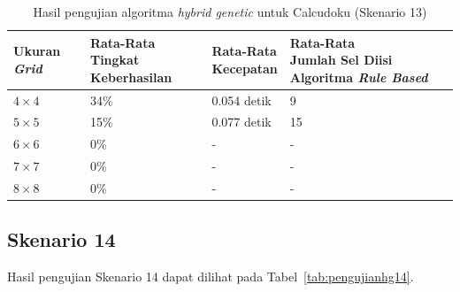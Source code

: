 \begin{table}
\centering
\captionsetup{justification=centering}
\caption[Hasil pengujian algoritma \textit{hybrid genetic} untuk Calcudoku (Skenario 13)]{Hasil pengujian algoritma \textit{hybrid genetic} untuk Calcudoku (Skenario 13)}
\begin{tabular}{| l | l | l | l |}
\hline
Ukuran \textit{Grid} & \makecell[l]{Rata-Rata \\ Tingkat Keberhasilan} & \makecell[l]{Rata-Rata \\ Kecepatan} & \makecell[l]{Rata-Rata \\ Jumlah Sel Diisi Algoritma \textit{Rule Based}} \\
\hline \hline
\begin{math}4 \times 4\end{math} & 34\% & 0.054 detik & 9 \\
\hline
\begin{math}5 \times 5\end{math} & 15\% & 0.077 detik & 15 \\
\hline
\begin{math}6 \times 6\end{math} & 0\% & - & - \\
\hline
\begin{math}7 \times 7\end{math} & 0\% & - & - \\
\hline
\begin{math}8 \times 8\end{math} & 0\% & - & - \\
\hline
\end{tabular}
\label{tab:pengujianhg13}
\end{table}

\clearpage

\subsection{Skenario 14}
\label{sec:skenario14}

Hasil pengujian Skenario 14 dapat dilihat pada Tabel~\ref{tab:pengujianhg14}.

